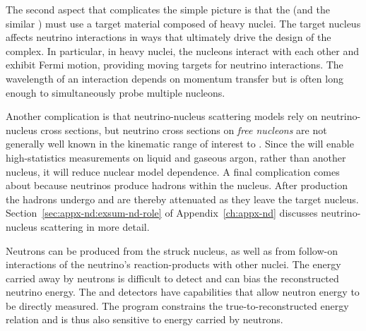 The second aspect that complicates the simple picture is that the  (and the similar ) must use a target material composed of heavy nuclei. %
The target nucleus affects %
neutrino interactions in ways that ultimately drive the design of the   complex. In particular, in heavy nuclei, the nucleons interact with each other and exhibit Fermi motion, providing moving targets for neutrino interactions. 
The wavelength of an interaction %
depends on momentum transfer but is often long enough to simultaneously probe multiple nucleons. 


Another complication is that neutrino-nucleus scattering models rely on neutrino-nucleus cross sections, but neutrino cross sections on \textit{free nucleons} are not generally well known in the kinematic range of interest to .  
Since the  will enable high-statistics measurements on liquid and gaseous argon, rather than another nucleus, it will reduce nuclear model dependence. 
 A final complication comes about because neutrinos produce hadrons within the nucleus. After production the hadrons undergo  and are thereby attenuated as they leave the target nucleus. Section~\ref{sec:appx-nd:exsum-nd-role} of Appendix~\ref{ch:appx-nd} discusses neutrino-nucleus scattering in more detail. %

Neutrons can be produced from the struck nucleus, as well as from follow-on interactions of the neutrino's reaction-products with other nuclei. The energy carried away by neutrons is difficult to detect and can bias the reconstructed neutrino energy. The   and  detectors have capabilities that allow neutron energy to be directly measured. The  program constrains the true-to-reconstructed energy relation and is thus also sensitive to energy carried by neutrons.

